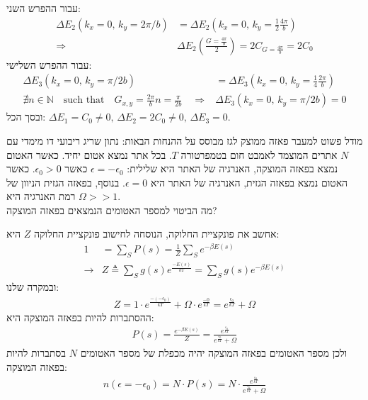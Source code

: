 \documentclass{article}
\begin{document}
\begin{Answer}
עבור ההפרש השני:
\begin{align*}
    \Delta E_{2}\left( k_{x}=0,\, k_{y}=2\pi/b \right)&=\Delta E_{2}\left( k_{x}=0,\, k_{y}=\frac{1}{2}\frac{4\pi}{b} \right)\\
    \Rightarrow &\Delta E_{2}\left( \frac{G=\frac{4\pi}{b}}{2} \right)=2C_{G=\frac{4\pi}{b}}=2C_{0}
\end{align*}
עבור ההפרש השלישי:
\begin{align*}
    \Delta E_{3}\left( k_{x}=0,\, k_{y}=\pi/2b \right)&=\Delta E_{3}\left( k_{x}=0,\, k_{y}=\frac{1}{4}\frac{2\pi}{b} \right)\\
    \nexists n\in \mathbb{N}\quad \text{such that}\quad G_{x,y}=\frac{2\pi}{b}n=\frac{\pi}{2b}\quad \Rightarrow &\Delta E_{3}\left( k_{x}=0,\, k_{y}=\pi/2b \right)=0
\end{align*}
ובסך הכל: ${\Delta E_{1}=C_{0}\neq0,\, \Delta E_{2}=2C_{0}\neq0,\, \Delta E_{3}=0}$.
\end{Answer}
\begin{Question}
מודל פשוט למעבר פאזה ממוצק לגז מבוסס על ההנחות הבאות: נתון שריג ריבועי דו מימדי עם $N$ אתרים המוצמד לאמבט חום בטמפרטורה $T$. בכל אתר נמצא אטום יחיד. כאשר האטום נמצא בפאזה המוצקה, האנרגיה של האתר היא שלילית: $\epsilon=-\epsilon_{0}$ כאשר $\epsilon_{0}>0$. כאשר האטום נמצא בפאזה הגזית, האנרגיה של האתר היא $\epsilon=0$. בנוסף, בפאזה הגזית הניוון של רמת האנרגיה היא $\Omega>>1$.\\
מה הביטוי למספר האטומים הנמצאים בפאזה המוצקה?
\end{Question}
\begin{Answer}
אחשב את פונקציית החלוקה,
הנוסחה לחישוב פונקציית החלוקה $Z$ היא:
\begin{align}\label{פונקציית החלוקה}
    1&=\sum \limits^{}_{S}{P\left( s \right)}=\frac{1}{Z}\sum \limits^{}_{S}{e^{-\beta E\left( s \right)}}\\
    \rightarrow&Z\triangleq \sum \limits^{}_{S}{g(s)e^{\frac{-E\left( s \right)}{kT} }}=\sum \limits^{}_{S}{g(s)e^{-\beta E\left( s \right)}}
\end{align}
ובמקרה שלנו:
\begin{align*}
    Z=1\cdot e^{\frac{-\left( -\epsilon_0 \right)}{kT}} + \Omega\cdot e^{\frac{-0}{kT}}=e^{\frac{\epsilon_0}{kT}}+\Omega
\end{align*}
ההסתברות להיות בפאזה המוצקה היא:
\begin{align*}
    P\left( s \right)=\frac{e^{-\beta E\left( s \right)}}{Z}=\frac{e^{\frac{\epsilon_0}{kT}}}{e^{\frac{\epsilon_0}{kT}}+\Omega}
\end{align*}
ולכן מספר האטומים בפאזה המוצקה יהיה מכפלת של מספר האטומים $N$ בסתברות להיות בפאזה המוצקה:
\begin{align*}
    n\left( \epsilon=-\epsilon_{0} \right)=N\cdot P\left( s \right)=N\cdot \frac{e^{\frac{\epsilon_0}{kT}}}{e^{\frac{\epsilon_0}{kT}}+\Omega}
\end{align*}
\end{Answer}
\end{document}
